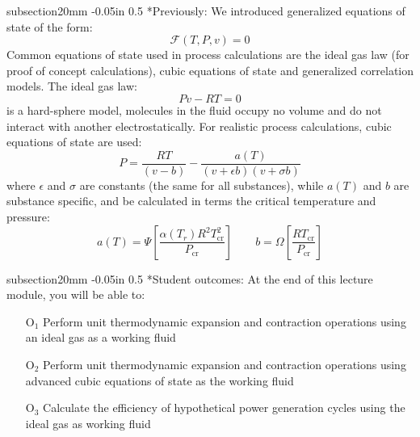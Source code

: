 \documentclass[11pt]{article}
\makeatletter
\theoremstyle{definition}
\renewcommand\subsection{\@startsection
	{subsection}{2}{0mm}
	{-0.05in}
	{0.5\baselineskip}
	{\normalfont\normalsize\bfseries}}
\makeatother
\begin{document}
\begin{mdframed}[backgroundcolor=lgray]
\subsection*{Previously:}
\noindent We introduced generalized equations of state of the form:
\begin{equation}
	\mathcal{F}\left(T,P,v\right) = 0
\end{equation}
Common equations of state used in process calculations are the ideal gas law (for proof of concept calculations), cubic equations of state and generalized correlation models. The ideal gas law:
\begin{equation}
	Pv - RT = 0
\end{equation}is a hard-sphere model, molecules in the fluid occupy no volume and do not interact with another electrostatically.
For realistic process calculations, cubic equations of state are used:
\begin{equation}
	P = \frac{RT}{\left(v-b\right)}-\frac{a(T)}{\left(v+\epsilon b\right)\left(v+\sigma b\right)}
\end{equation}where $\epsilon$ and $\sigma$ are constants (the same for all substances), while
$a(T)$ and $b$ are substance specific, and be calculated in terms the critical temperature and pressure:
\begin{equation}
	a\left(T\right) = \Psi\left[\frac{\alpha\left(T_{r}\right)R^{2}T^{2}_{\mathrm{cr}}}{P_{\mathrm{cr}}}\right]\qquad
	b = \Omega\left[\frac{RT_{\mathrm{cr}}}{P_{\mathrm{cr}}}\right]
\end{equation}

\subsection*{Student outcomes:}
At the end of this lecture module, you will be able to:
\begin{itemize}
	\item[O$_1$]{Perform unit thermodynamic expansion and contraction operations using an ideal gas as a working fluid}
	\item[O$_2$]{Perform unit thermodynamic expansion and contraction operations using advanced cubic equations of state as the working fluid}
	\item[O$_3$]{Calculate the efficiency of hypothetical power generation cycles using the ideal gas as working fluid}
\end{itemize}

\end{mdframed}
\end{document}
